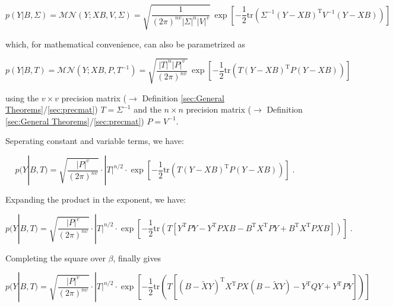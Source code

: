 \documentclass[a4paper,12pt,twoside]{book}
\begin{document}
\begin{equation} \label{eq:mblr-prior-GLM-LF-Class}
p(Y|B,\Sigma) = \mathcal{MN}(Y; X B, V, \Sigma) = \sqrt{\frac{1}{(2 \pi)^{nv} |\Sigma|^n |V|^v}} \, \exp\left[ -\frac{1}{2} \mathrm{tr}\left( \Sigma^{-1} (Y-XB)^\mathrm{T} V^{-1} (Y-XB) \right) \right]
\end{equation}

which, for mathematical convenience, can also be parametrized as

\begin{equation} \label{eq:mblr-prior-GLM-LF-Bayes}
p(Y|B,T) = \mathcal{MN}(Y; X B, P, T^{-1}) = \sqrt{\frac{|T|^n |P|^v}{(2 \pi)^{nv}}} \, \exp\left[ -\frac{1}{2} \mathrm{tr}\left( T (Y-XB)^\mathrm{T} P (Y-XB) \right) \right]
\end{equation}

using the $v \times v$ precision matrix ($\rightarrow$ Definition \ref{sec:General Theorems}/\ref{sec:precmat}) $T = \Sigma^{-1}$ and the $n \times n$ precision matrix ($\rightarrow$ Definition \ref{sec:General Theorems}/\ref{sec:precmat}) $P = V^{-1}$.

\vspace{1em}
Seperating constant and variable terms, we have:

\begin{equation} \label{eq:mblr-prior-GLM-LF-s1}
p(Y|B,T) = \sqrt{\frac{|P|^v}{(2 \pi)^{nv}}} \cdot |T|^{n/2} \cdot \exp\left[ -\frac{1}{2} \mathrm{tr}\left( T (Y-XB)^\mathrm{T} P (Y-XB) \right) \right] \; .
\end{equation}

Expanding the product in the exponent, we have:

\begin{equation} \label{eq:mblr-prior-GLM-LF-s2}
p(Y|B,T) = \sqrt{\frac{|P|^v}{(2 \pi)^{nv}}} \cdot |T|^{n/2} \cdot \exp\left[ -\frac{1}{2} \mathrm{tr}\left( T \left[ Y^\mathrm{T} P Y - Y^\mathrm{T} P X B - B^\mathrm{T} X^\mathrm{T} P Y + B^\mathrm{T} X^\mathrm{T} P X B \right] \right) \right] \; .
\end{equation}

Completing the square over $\beta$, finally gives

\begin{equation} \label{eq:mblr-prior-GLM-LF-s3}
p(Y|B,T) = \sqrt{\frac{|P|^v}{(2 \pi)^{nv}}} \cdot |T|^{n/2} \cdot \exp\left[ -\frac{1}{2} \mathrm{tr}\left( T \left[ (B - \tilde{X}Y)^\mathrm{T} X^\mathrm{T} P X (B - \tilde{X}Y) - Y^\mathrm{T} Q Y + Y^\mathrm{T} P Y \right] \right) \right]
\end{equation}
\end{document}
